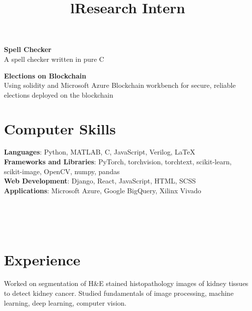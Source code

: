 \documentclass[margin]{res}
\begin{document}
\begin{resume}
      \par
      \textbf{Spell Checker}\\
      A spell checker written in pure C

      \par
      \textbf{Elections on Blockchain}\\
      Using solidity and Microsoft Azure Blockchain workbench for secure, reliable elections deployed on the blockchain

    \section{Computer Skills}
      \textbf{Languages}: Python, MATLAB, C, JavaScript, Verilog, \LaTeX
      \\
      \textbf{Frameworks and Libraries}: PyTorch, torchvision, torchtext, scikit-learn, scikit-image, OpenCV, numpy, pandas
      \\
      \textbf{Web Development}: Django, React, JavaScript, HTML, SCSS
      \\
      \textbf{Applications}: Microsoft Azure, Google BigQuery, Xilinx Vivado


    \begin{format}
      \title{l}\\
      \\
      \body\\
    \end{format}

    \section{Experience}
      \title{\textbf{Research Intern}}
      \begin{position}
        Worked on segmentation of H\&E stained histopathology images of kidney tissues to detect kidney cancer. Studied fundamentals of image processing, machine learning, deep learning, computer vision.
      \end{position}


\end{resume}
\end{document}
